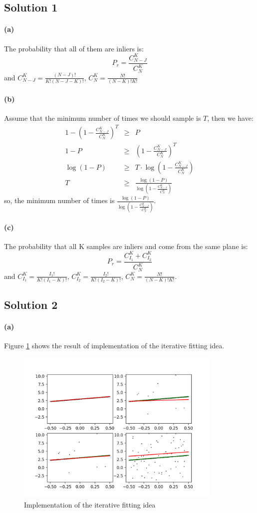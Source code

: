 \documentclass{article}
\newcommand{\solution}[1]{\clearpage \subsection*{Solution #1}}
\newcommand{\spart}[1]{\paragraph{(#1)}}
\begin{document}

\solution{1}
\spart{a}The probability that all of them are inliers is:
$$
P_r = \frac{C_{N-J}^{K}}{C_{N}^{K}}
$$
and $C_{N-J}^{K}=\frac{(N-J)!}{K!(N-J-K)!}$, $C_{N}^{K}=\frac{N!}{(N-K)!K!}$

\spart{b} Assume that the minimum number of times we should sample is $T$, then we have:
\begin{eqnarray*}
1 - (1 - \frac{C_{N-J}^{K}}{C_{N}^{K}})^{T} &\ge& P \\
                          1 - P & \ge & (1 - \frac{C_{N-J}^{K}}{C_{N}^{K}})^{T}\\
                          \log {(1-P)} &\ge& T\cdot \log {(1 - \frac{C_{N-J}^{K}}{C_{N}^{K}})}\\
                          T &\ge&\frac{\log {(1-P)}}{\log {(1 - \frac{C_{N-J}^{K}}{C_{N}^{K}})}}
\end{eqnarray*}
so, the minimum number of times is $\frac{\log {(1-P)}}{\log {(1 - \frac{C_{N-J}^{K}}{C_{N}^{K}})}}$.

\spart{c} The probability that all K samples are inliers and come from the same plane is:
$$
P_r = \frac{C_{I_1}^{K} + C_{I_2}^{K}}{C_N^K}
$$
and $C_{I_1}^{K} = \frac{{I_1}!}{K!(I_1 - K)!}$, $C_{I_2}^{K} = \frac{{I_2}!}{K!(I_2 - K)!}$, $C_{N}^{K}=\frac{N!}{(N-K)!K!}$.

\solution{2} 

\spart{a} Figure \ref{fig:prob2a} shows the result of implementation of the iterative fitting idea.

\begin{figure}[!h]
  \centering
  \includegraphics[height=20em]{code/outputs/prob2a.png}
  \caption{Implementation of the iterative fitting idea}
  \label{fig:prob2a}
\end{figure}
\end{document}
